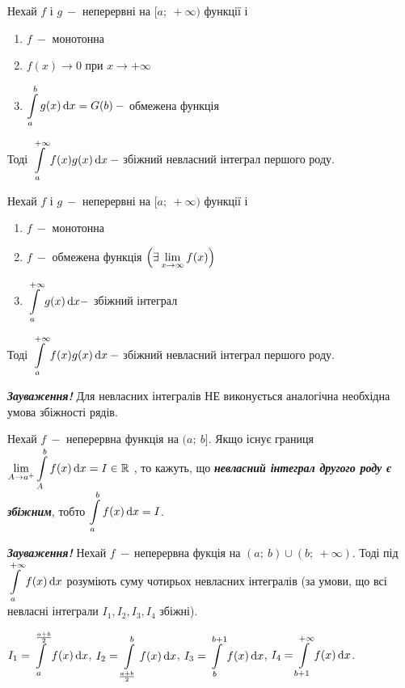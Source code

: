 \begin{theorem} 
Нехай $f$ і $g \: -$ неперервні на $[a; \: +\infty)$ функції і 
       \begin{enumerate}
           \item $f \: - $ монотонна 
           \item $f(x) \rightarrow 0 $ при $x \to +\infty$
           \item $\displaystyle\int\limits_a^b g(x) \, \mathrm{d}x = G(b) \: - $ обмежена функція
       \end{enumerate}
Тоді $\displaystyle\int\limits_a^{+\infty} f(x)  g(x) \, \mathrm{d}x \: - $ збіжний невласний інтеграл першого роду. 
\end{theorem}
\newpage
\begin{theorem} 
Нехай $f$ і $g \: -$ неперервні на $[a; \: +\infty)$ функції і 
       \begin{enumerate}
           \item $f \: - $ монотонна 
           \item $f \: - $ обмежена функція $\left( \exists \displaystyle\lim\limits_{x \to \infty} f(x)\right)$
           \item $\displaystyle\int\limits_a^{+\infty} g(x) \, \mathrm{d}x - $ збіжний інтеграл
       \end{enumerate}
Тоді $\displaystyle\int\limits_a^{+\infty} f(x)  g(x) \, \mathrm{d}x \: - $ збіжний невласний інтеграл першого роду. 

\end{theorem}

 \textcolor{NavyBlue}{\textbf{\textit{Зауваження!}}} Для невласних інтегралів НЕ виконується аналогічна необхідна умова збіжності рядів. 

\begin{definition}
    Нехай $f \: -$ неперервна функція на $(a; \: b]$. Якщо існує границя $ \displaystyle\lim\limits_{A \to a^+} \displaystyle\int\limits_A^b f(x) \, \mathrm{d}x=I \in \mathbb{R}$ , то кажуть, що  \textcolor{NavyBlue}{\textbf{\textit{невласний інтеграл другого 
    роду є збіжним}}}, тобто $\displaystyle\int\limits _a^b f(x) \, \mathrm{d}x = I$.
\end{definition}
\textcolor{NavyBlue}{\textbf{\textit{Зауваження!}}} Нехай $f \: - \ $неперервна фукція на  $(a; \: b)\cup (b; \: +\infty) $. Тоді під $\displaystyle\int\limits _a^{+\infty} f(x) \, \mathrm{d}x$ розуміють суму чотирьох невласних інтегралів (за умови, що всі невласні інтеграли $I_1, I_2, I_3, I_4$ збіжні). 

$I_1 = \displaystyle\int\limits _a^{\frac{a+b}{2}} f(x) \, \mathrm{d}x$, \;
$I_2 = \displaystyle\int\limits _{\frac{a+b}{2}}^b f(x) \, \mathrm{d}x$, \;
$I_3 = \displaystyle\int\limits _b^{b+1} f(x) \, \mathrm{d}x$,  \;
$I_4 = \displaystyle\int\limits _{b+1}^{+\infty} f(x) \, \mathrm{d}x$.

